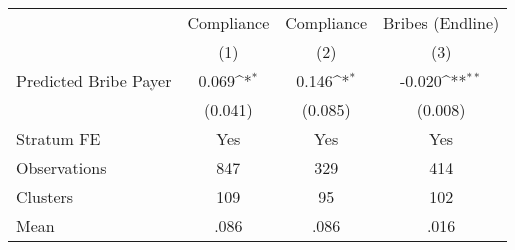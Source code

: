 {
\def\sym#1{\ifmmode^{#1}\else\(^{#1}\)\fi}
\begin{tabular}{l*{3}{c}}
\hline\hline
                &\multicolumn{1}{c}{Compliance}&\multicolumn{1}{c}{Compliance}&\multicolumn{1}{c}{Bribes (Endline)}\\
                &\multicolumn{1}{c}{(1)}         &\multicolumn{1}{c}{(2)}         &\multicolumn{1}{c}{(3)}         \\
\hline
Predicted Bribe Payer&    0.069\sym{*}  &    0.146\sym{*}  &   -0.020\sym{**} \\
                &  (0.041)         &  (0.085)         &  (0.008)         \\
Stratum FE      &      Yes         &      Yes         &      Yes         \\
\hline
Observations    &      847         &      329         &      414         \\
Clusters        &      109         &       95         &      102         \\
Mean            &     .086         &     .086         &     .016         \\
\hline\hline
\end{tabular}
}
